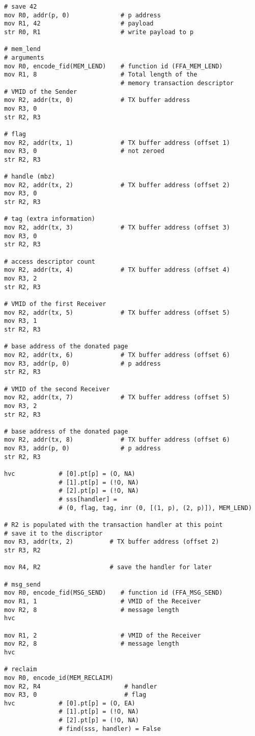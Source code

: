 \documentclass{article}
\begin{document}
\begin{lstlisting}[caption={VM 0}]
# save 42
mov R0, addr(p, 0)              # p address
mov R1, 42                      # payload
str R0, R1                      # write payload to p

# mem_lend
# arguments
mov R0, encode_fid(MEM_LEND)    # function id (FFA_MEM_LEND)
mov R1, 8                       # Total length of the  
                                # memory transaction descriptor
# VMID of the Sender 
mov R2, addr(tx, 0)             # TX buffer address                               
mov R3, 0
str R2, R3

# flag
mov R2, addr(tx, 1)             # TX buffer address (offset 1)                               
mov R3, 0                       # not zeroed
str R2, R3

# handle (mbz)
mov R2, addr(tx, 2)             # TX buffer address (offset 2)
mov R3, 0
str R2, R3

# tag (extra information)
mov R2, addr(tx, 3)             # TX buffer address (offset 3)
mov R3, 0
str R2, R3

# access descriptor count
mov R2, addr(tx, 4)             # TX buffer address (offset 4)
mov R3, 2
str R2, R3

# VMID of the first Receiver
mov R2, addr(tx, 5)             # TX buffer address (offset 5)
mov R3, 1
str R2, R3

# base address of the donated page
mov R2, addr(tx, 6)             # TX buffer address (offset 6)
mov R3, addr(p, 0)              # p address
str R2, R3

# VMID of the second Receiver
mov R2, addr(tx, 7)             # TX buffer address (offset 5)
mov R3, 2
str R2, R3

# base address of the donated page
mov R2, addr(tx, 8)             # TX buffer address (offset 6)
mov R3, addr(p, 0)              # p address
str R2, R3

hvc            # [0].pt[p] = (O, NA)
               # [1].pt[p] = (!O, NA)
               # [2].pt[p] = (!O, NA)
               # sss[handler] = 
               # (0, flag, tag, inr (0, [(1, p), (2, p)]), MEM_LEND)

# R2 is populated with the transaction handler at this point
# save it to the discriptor
mov R3, addr(tx, 2)          # TX buffer address (offset 2)
str R3, R2

mov R4, R2                   # save the handler for later

# msg_send
mov R0, encode_fid(MSG_SEND)    # function id (FFA_MSG_SEND)
mov R1, 1                       # VMID of the Receiver
mov R2, 8                       # message length
hvc 

mov R1, 2                       # VMID of the Receiver
mov R2, 8                       # message length
hvc

# reclaim
mov R0, encode_id(MEM_RECLAIM)
mov R2, R4                       # handler
mov R3, 0                        # flag
hvc            # [0].pt[p] = (O, EA)
               # [1].pt[p] = (!O, NA)
               # [2].pt[p] = (!O, NA)
               # find(sss, handler) = False       
\end{lstlisting}
\end{document}
